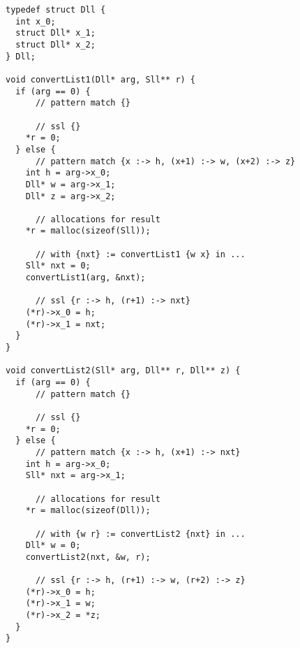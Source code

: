 \begin{lstlisting}
typedef struct Dll {
  int x_0;
  struct Dll* x_1;
  struct Dll* x_2;
} Dll;

void convertList1(Dll* arg, Sll** r) {
  if (arg == 0) {
      // pattern match {}

      // ssl {}
    *r = 0;
  } else {
      // pattern match {x :-> h, (x+1) :-> w, (x+2) :-> z}
    int h = arg->x_0;
    Dll* w = arg->x_1;
    Dll* z = arg->x_2;

      // allocations for result
    *r = malloc(sizeof(Sll));

      // with {nxt} := convertList1 {w x} in ...
    Sll* nxt = 0;
    convertList1(arg, &nxt);

      // ssl {r :-> h, (r+1) :-> nxt}
    (*r)->x_0 = h;
    (*r)->x_1 = nxt;
  }
}

void convertList2(Sll* arg, Dll** r, Dll** z) {
  if (arg == 0) {
      // pattern match {}

      // ssl {}
    *r = 0;
  } else {
      // pattern match {x :-> h, (x+1) :-> nxt}
    int h = arg->x_0;
    Sll* nxt = arg->x_1;

      // allocations for result
    *r = malloc(sizeof(Dll));

      // with {w r} := convertList2 {nxt} in ...
    Dll* w = 0;
    convertList2(nxt, &w, r);

      // ssl {r :-> h, (r+1) :-> w, (r+2) :-> z}
    (*r)->x_0 = h;
    (*r)->x_1 = w;
    (*r)->x_2 = *z;
  }
}
\end{lstlisting}

